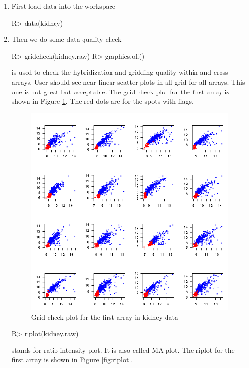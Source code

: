 \begin{enumerate}
\item First load data into the workspace
\begin{Sinput}
R> data(kidney)
\end{Sinput}
\item Then we do some data quality check
\begin{Sinput}
R> gridcheck(kidney.raw)
R> graphics.off()
\end{Sinput}
 is used to check the hybridization 
and gridding quality within and
cross arrays. User should see near linear scatter 
plots in all grid for all arrays. 
This one is not great but acceptable. The grid check plot for the first array
is shown in Figure \ref{fig:gridcheck}. The red dots are for the spots with flags.
\begin{figure}[htbp]
\centering
\includegraphics{gridcheck.png}
\caption{Grid check plot for the first array in kidney data}
\label{fig:gridcheck}
\end{figure}
\begin{Sinput}
R> riplot(kidney.raw)
\end{Sinput}
 stands for ratio-intensity plot. It is also called MA plot. 
The riplot for the first array is shown in Figure \ref{fig:riplot}. 
\begin{figure}[htbp]
\centering

\end{figure}
\end{enumerate}
